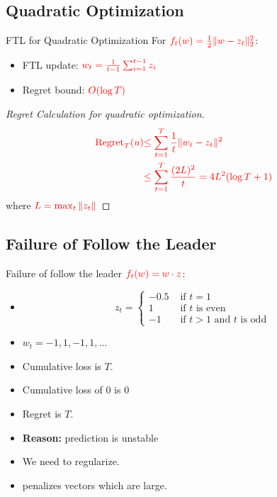 \documentclass[handout]{beamer}
\begin{document}
\begin{small}
\subsection{Quadratic Optimization}
\begin{frame}{FTL for Quadratic Optimization}
For $\textcolor{red}{f_t(w) = \frac{1}{2}\|w - z_t\|_2^2}$:
\begin{itemize}
\item FTL update: $\textcolor{red}{w_t = \frac{1}{t-1}\sum_{i=1}^{t-1} z_i}$
\item Regret bound: $\textcolor{red}{O(\log T)}$
\end{itemize}
\begin{proof}[Regret Calculation for quadratic optimization]
\begin{align*}
\textcolor{red}{\text{Regret}_T(u)} &\textcolor{red}{\leq \sum_{t=1}^T \frac{1}{t} \|w_t - z_t\|^2} \\
&\textcolor{red}{\leq \sum_{t=1}^T \frac{(2L)^2}{t} = 4L^2(\log T + 1)}
\end{align*}
where $\textcolor{red}{L = \max_t \|z_t\|}$
\end{proof}
\end{frame}

\subsection{Failure of Follow the Leader}

\begin{frame}{Failure of follow the leader}
$\textcolor{red}{f_t(w) = w \cdot z}$:
\begin{itemize}
\item
  $$z_t= \begin{cases}
           -0.5 & \text{ if } t=1\\
           1 & \text{ if } t \text{ is even} \\
           -1 & \text{ if } t>1 \mbox{ and } t \text{ is odd}
         \end{cases}
         $$
         \item $w_t=-1,1,-1,1,\ldots$
  \item Cumulative loss is $T$.
  \item Cumulative loss of $0$ is $0$
  \item Regret is $T$.
  \item {\bf Reason:} prediction is unstable
  \item We need to regularize.
    \item {} penalizes vectors which are large.
  \end{itemize}
\end{frame}


\end{small}
\end{document}
